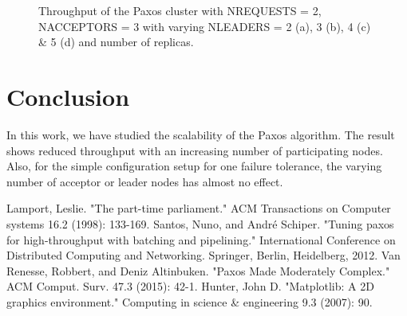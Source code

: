 \documentclass[conference, onecolumn]{IEEEtran}
\begin{document}
\begin{figure}[!ht]
	\begin{minipage}{\textwidth}
		\label{figure2}
		\centering
		\vspace*{-3cm}
		\quad
		\\
		\quad
		\caption{Throughput of the Paxos cluster with NREQUESTS = 2, NACCEPTORS = 3 with varying NLEADERS = 2 (a), 3 (b), 4 (c) \& 5 (d) and number of replicas. }
	\end{minipage}\\[1em]
\end{figure}
\section{Conclusion}
In this work, we have studied the scalability of the Paxos algorithm. 
The result shows reduced throughput with an increasing number of participating nodes. 
Also, for the simple configuration setup for one failure tolerance, the varying number of acceptor or leader nodes has almost no effect. 

%
%

\begin{thebibliography}{00}
 Lamport, Leslie. "The part-time parliament." ACM Transactions on Computer systems 16.2 (1998): 133-169.
 Santos, Nuno, and André Schiper. "Tuning paxos for high-throughput with batching and pipelining." International Conference on Distributed Computing and Networking. Springer, Berlin, Heidelberg, 2012.
 Van Renesse, Robbert, and Deniz Altinbuken. "Paxos Made Moderately Complex." ACM Comput. Surv. 47.3 (2015): 42-1.
 Hunter, John D. "Matplotlib: A 2D graphics environment." Computing in science \& engineering 9.3 (2007): 90.
\end{thebibliography}
\end{document}
